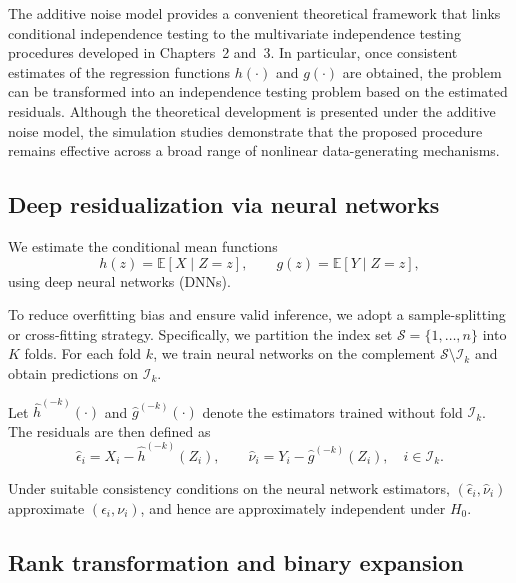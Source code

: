 \documentclass[12pt,reqno,oneside]{amsbook}
\theoremstyle{definition}
\theoremstyle{remark}
\begin{document}
The additive noise model provides a convenient theoretical framework that links conditional independence testing to the multivariate independence testing procedures developed in Chapters~2 and~3.
In particular, once consistent estimates of the regression functions $h(\cdot)$ and $g(\cdot)$ are obtained, the problem can be transformed into an independence testing problem based on the estimated residuals. Although the theoretical development is presented under the additive noise model, the simulation studies demonstrate that the proposed procedure remains effective across a broad range of nonlinear data-generating mechanisms.




\subsection{Deep residualization via neural networks}

We estimate the conditional mean functions
\[
h(z) = \mathbb{E}[X \mid Z=z],
\qquad
g(z) = \mathbb{E}[Y \mid Z=z],
\]
using deep neural networks (DNNs).

To reduce overfitting bias and ensure valid inference, we adopt a
sample-splitting or cross-fitting strategy. Specifically, we partition the
index set $\mathcal{S} = \{1,\ldots,n\}$ into $K$ folds. For each fold $k$,
we train neural networks on the complement $\mathcal{S}\setminus\mathcal{I}_k$
and obtain predictions on $\mathcal{I}_k$.

Let $\widehat h^{(-k)}(\cdot)$ and $\widehat g^{(-k)}(\cdot)$ denote the
estimators trained without fold $\mathcal{I}_k$. The residuals are then defined as
\begin{equation}
\hat\epsilon_i = X_i - \widehat h^{(-k)}(Z_i),
\qquad
\hat\nu_i = Y_i - \widehat g^{(-k)}(Z_i),
\quad i \in \mathcal{I}_k.
\label{eq:residuals_multi}
\end{equation}

Under suitable consistency conditions on the neural network estimators,
$(\hat\epsilon_i, \hat\nu_i)$ approximate $(\epsilon_i, \nu_i)$, and hence
are approximately independent under $H_0$.


\subsection{Rank transformation and binary expansion}
\end{document}
